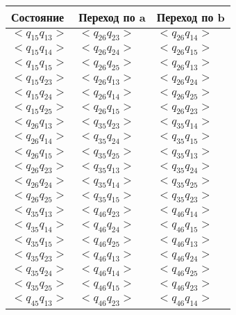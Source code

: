 \documentclass{article}
\begin{document}
\begin{enumerate}
            \begin{tabular} { | l | l | l | }
                \hline 
                Состояние & Переход по a & Переход по b \\ \hline
                $<q_{15} q_{13}>$ & $<q_{26} q_{23}>$ & $<q_{26} q_{14}>$ \\ \hline
                $<q_{15} q_{14}>$ & $<q_{26} q_{24}>$ & $<q_{26} q_{15}>$ \\ \hline
                $<q_{15} q_{15}>$ & $<q_{26} q_{25}>$ & $<q_{26} q_{13}>$ \\ \hline
                $<q_{15} q_{23}>$ & $<q_{26} q_{13}>$ & $<q_{26} q_{24}>$ \\ \hline
                $<q_{15} q_{24}>$ & $<q_{26} q_{14}>$ & $<q_{26} q_{25}>$ \\ \hline
                $<q_{15} q_{25}>$ & $<q_{26} q_{15}>$ & $<q_{26} q_{23}>$ \\ \hline
                $<q_{26} q_{13}>$ & $<q_{35} q_{23}>$ & $<q_{35} q_{14}>$ \\ \hline
                $<q_{26} q_{14}>$ & $<q_{35} q_{24}>$ & $<q_{35} q_{15}>$ \\ \hline
                $<q_{26} q_{15}>$ & $<q_{35} q_{25}>$ & $<q_{35} q_{13}>$ \\ \hline
                $<q_{26} q_{23}>$ & $<q_{35} q_{13}>$ & $<q_{35} q_{24}>$ \\ \hline
                $<q_{26} q_{24}>$ & $<q_{35} q_{14}>$ & $<q_{35} q_{25}>$ \\ \hline
                $<q_{26} q_{25}>$ & $<q_{35} q_{15}>$ & $<q_{35} q_{23}>$ \\ \hline
                $<q_{35} q_{13}>$ & $<q_{46} q_{23}>$ & $<q_{46} q_{14}>$ \\ \hline
                $<q_{35} q_{14}>$ & $<q_{46} q_{24}>$ & $<q_{46} q_{15}>$ \\ \hline
                $<q_{35} q_{15}>$ & $<q_{46} q_{25}>$ & $<q_{46} q_{13}>$ \\ \hline
                $<q_{35} q_{23}>$ & $<q_{46} q_{13}>$ & $<q_{46} q_{24}>$ \\ \hline
                $<q_{35} q_{24}>$ & $<q_{46} q_{14}>$ & $<q_{46} q_{25}>$ \\ \hline
                $<q_{35} q_{25}>$ & $<q_{46} q_{15}>$ & $<q_{46} q_{23}>$ \\ \hline
                $<q_{45} q_{13}>$ & $<q_{46} q_{23}>$ & $<q_{46} q_{14}>$ \\
                \hline
            \end{tabular} \\
            

\end{enumerate}
\end{document}
